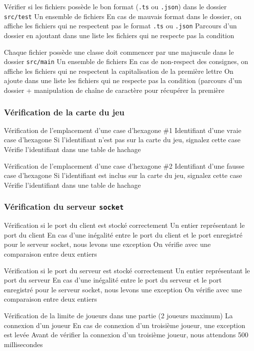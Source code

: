 \mytest
{Vérifier si les fichiers possède le bon format (\texttt{.ts} ou \texttt{.json}) dans le dossier \texttt{src/test}}
{Un ensemble de fichiers}
{En cas de mauvais format dans le dossier, on affiche les fichiers qui ne respectent pas le format \texttt{.ts} ou \texttt{.json}}
{Parcours d'un dossier en ajoutant dans une liste les fichiers qui ne respecte pas la condition}

\mytest
{Chaque fichier possède une classe doit commencer par une majuscule dans le dossier \texttt{src/main}}
{Un ensemble de fichiers}
{En cas de non-respect des consignes, on affiche les fichiers qui ne respectent la capitalisation de la première lettre}
{On ajoute dans une liste les fichiers qui ne respecte pas la condition (parcours d'un dossier + manipulation de chaîne de caractère pour récupérer la première}

\subsubsection{Vérification de la carte du jeu}

\mytest
{Vérification de l'emplacement d'une case d'hexagone \#1}
{Identifiant d'une vraie case d'hexagone}
{Si l'identifiant n'est pas sur la carte du jeu, signalez cette case}
{Vérifie l'identifiant dans une table de hachage}

\mytest
{Vérification de l'emplacement d'une case d'hexagone \#2}
{Identifiant d'une fausse case d'hexagone}
{Si l'identifiant est inclus sur la carte du jeu, signalez cette case}
{Vérifie l'identifiant dans une table de hachage}

\subsubsection{Vérification du serveur {\tt socket}}

\mytest
{Vérification si le port du client est stocké correctement}
{Un entier représentant le port du client}
{En cas d'une inégalité entre le port du client et le port enregistré pour le serveur socket, nous levons une exception}
{On vérifie avec une comparaison entre deux entiers}

\mytest
{Vérification si le port du serveur est stocké correctement}
{Un entier représentant le port du serveur}
{En cas d'une inégalité entre le port du serveur et le port enregistré pour le serveur socket, nous levons une exception}
{On vérifie avec une comparaison entre deux entiers}

\mytest
{Vérification de la limite de joueurs dans une partie (2 joueurs maximum)}
{La connexion d'un joueur}
{En cas de connexion d'un troisième joueur, une exception est levée}
{Avant de vérifier la connexion d'un troisième joueur, nous attendons 500 millisecondes}

